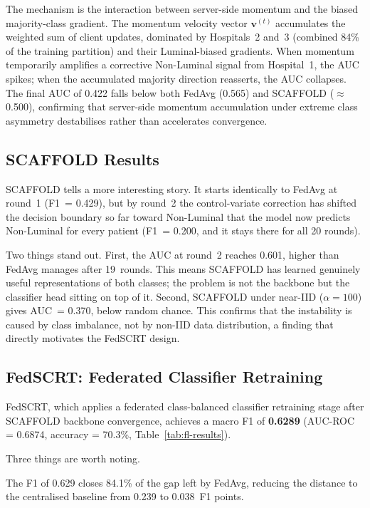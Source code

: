 The mechanism is the interaction between server-side
momentum and the biased majority-class gradient.
The momentum velocity vector $\mathbf{v}^{(t)}$
accumulates the weighted sum of client updates,
dominated by Hospitals~2 and~3 (combined 84\% of the
training partition) and their Luminal-biased gradients.
When momentum temporarily amplifies a corrective
Non-Luminal signal from Hospital~1, the AUC spikes;
when the accumulated majority direction reasserts,
the AUC collapses.
The final AUC of 0.422 falls below both FedAvg (0.565)
and SCAFFOLD ($\approx$0.500), confirming that server-side
momentum accumulation under extreme class asymmetry
destabilises rather than accelerates convergence.

\subsection{SCAFFOLD Results}
\label{sec:scaffold-results}

SCAFFOLD tells a more interesting story.
It starts identically to FedAvg at round~1
(F1~= 0.429), but by round~2 the control-variate
correction has shifted the decision boundary so far
toward Non-Luminal that the model now predicts
Non-Luminal for every patient (F1~= 0.200, and it
stays there for all 20 rounds).

Two things stand out.
First, the AUC at round~2 reaches 0.601, higher
than FedAvg manages after 19~rounds.
This means SCAFFOLD has learned genuinely useful
representations of both classes; the problem is not
the backbone but the classifier head sitting on top
of it.
Second, SCAFFOLD under near-IID ($\alpha=100$) gives
AUC~= 0.370, below random chance.
This confirms that the instability is caused by class
imbalance, not by non-IID data distribution,
a finding that directly motivates the FedSCRT design.

\subsection{FedSCRT: Federated Classifier Retraining}
\label{sec:fedscrt-results}

FedSCRT, which applies a federated class-balanced classifier
retraining stage after SCAFFOLD backbone convergence, achieves
a macro F1 of \textbf{0.6289} (AUC-ROC = 0.6874,
accuracy = 70.3\%, Table~\ref{tab:fl-results}).

Three things are worth noting.

The F1 of 0.629 closes 84.1\% of the gap left by
FedAvg, reducing the distance to the centralised
baseline from 0.239 to 0.038~F1 points.


